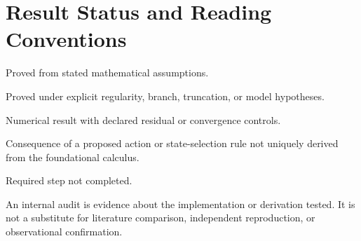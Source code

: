 \chapter*{Result Status and Reading Conventions}
\begin{description}[leftmargin=2.8cm,style=nextline]\item[Theorem] Proved from stated mathematical assumptions.\item[Conditional theorem] Proved under explicit regularity, branch, truncation, or model hypotheses.\item[Controlled computation] Numerical result with declared residual or convergence controls.\item[Model proposition] Consequence of a proposed action or state-selection rule not uniquely derived from the foundational calculus.\item[Open problem] Required step not completed.\end{description}
An internal audit is evidence about the implementation or derivation tested. It is not a substitute for literature comparison, independent reproduction, or observational confirmation.
